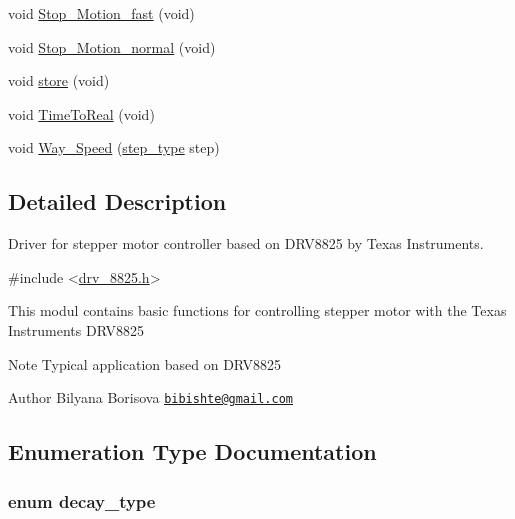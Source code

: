 \begin{DoxyCompactItemize}
void \hyperlink{group__biba__drv_ga1db502f9943a62943380a04ba0bd52cb}{Stop\-\_\-\-Motion\-\_\-fast} (void)
\item 
void \hyperlink{group__biba__drv_ga95c2965416e69e644b9f5a482707ae9f}{Stop\-\_\-\-Motion\-\_\-normal} (void)
\item 
void \hyperlink{group__biba__drv_gaaefaac2ed4c54f2008d8d236392c7261}{store} (void)
\item 
void \hyperlink{group__biba__drv_gaec239a01fef85140bc7c12fa612f421b}{Time\-To\-Real} (void)
\item 
void \hyperlink{group__biba__drv_ga102f936b773a4a26032cc6b8cd1a273d}{Way\-\_\-\-Speed} (\hyperlink{group__biba__drv_ga3af682b92aa259509aea217f6dc64356}{step\-\_\-type} step)
\end{DoxyCompactItemize}


\subsection{Detailed Description}
Driver for stepper motor controller based on D\-R\-V8825 by Texas Instruments. 
\begin{DoxyCode}
\textcolor{preprocessor}{#include <\hyperlink{drv__8825_8h}{drv\_8825.h}>} 
\end{DoxyCode}


This modul contains basic functions for controlling stepper motor with the Texas Instruments D\-R\-V8825

\begin{DoxyNote}{Note}
Typical application based on D\-R\-V8825 
\end{DoxyNote}
\begin{DoxyAuthor}{Author}
Bilyana Borisova \href{mailto:bibishte@gmail.com}{\tt bibishte@gmail.\-com} 
\end{DoxyAuthor}


\subsection{Enumeration Type Documentation}
\hypertarget{group__biba__drv_gafe05744bd777532cf059c0d7293a7ab8}{
\subsubsection[{decay\-\_\-type}]{\setlength{\rightskip}{0pt plus 5cm}enum {\bf decay\-\_\-type}}}\label{group__biba__drv_gafe05744bd777532cf059c0d7293a7ab8}


